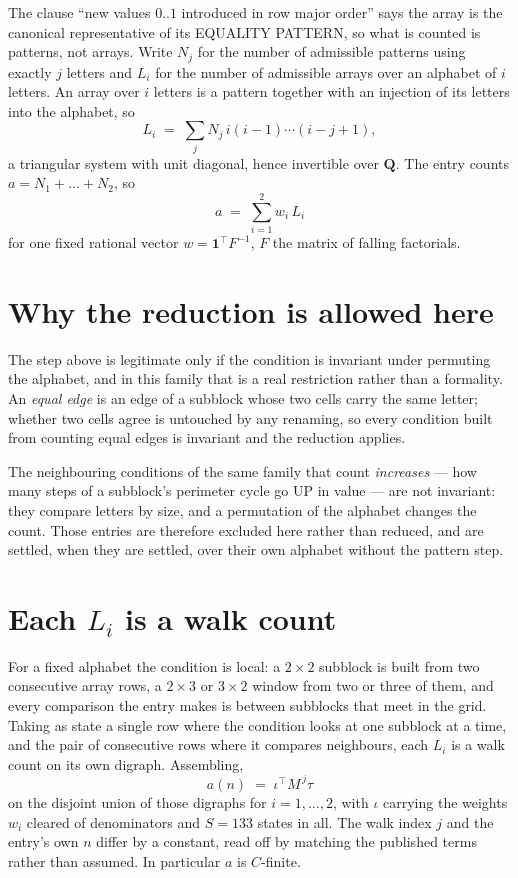 \documentclass[11pt,a4paper]{article}
\theoremstyle{plain}
\theoremstyle{definition}
\begin{document}
The clause ``new values $0..1$ introduced in row major order'' says the array is the
canonical representative of its EQUALITY PATTERN, so what is counted is patterns, not arrays.
Write $N_j$ for the number of admissible patterns using exactly $j$ letters and $L_i$ for the
number of admissible arrays over an alphabet of $i$ letters. An array over $i$ letters is a
pattern together with an injection of its letters into the alphabet, so
\[
L_i\;=\;\sum_j N_j\,i(i-1)\cdots(i-j+1),
\]
a triangular system with unit diagonal, hence invertible over $\mathbf{Q}$. The entry counts
$a=N_1+\dots+N_{2}$, so
\[
a\;=\;\sum_{i=1}^{2}w_i\,L_i
\]
for one fixed rational vector $w=\mathbf{1}^{\!\top}F^{-1}$, $F$ the matrix of falling
factorials.

\section{Why the reduction is allowed here}

The step above is legitimate only if the condition is invariant under permuting the alphabet,
and in this family that is a real restriction rather than a formality. An \emph{equal edge}
is an edge of a subblock whose two cells carry the same letter; whether two cells agree is
untouched by any renaming, so every condition built from counting equal edges is invariant and
the reduction applies.

The neighbouring conditions of the same family that count \emph{increases} --- how many steps
of a subblock's perimeter cycle go UP in value --- are not invariant: they compare letters by
size, and a permutation of the alphabet changes the count. Those entries are therefore excluded
here rather than reduced, and are settled, when they are settled, over their own alphabet
without the pattern step.

\section{Each $L_i$ is a walk count}

For a fixed alphabet the condition is local: a $2\times2$ subblock is built from two
consecutive array rows, a $2\times3$ or $3\times2$ window from two or three of them, and every
comparison the entry makes is between subblocks that meet in the grid. Taking as state a single
row where the condition looks at one subblock at a time, and the pair of consecutive rows where
it compares neighbours, each $L_i$ is a walk count on its own digraph. Assembling,
\[
a(n)\;=\;\iota^{\!\top}M^{\,j}\tau
\]
on the disjoint union of those digraphs for $i=1,\dots,2$, with $\iota$ carrying the weights
$w_i$ cleared of denominators and $S=133$ states in all. The walk index $j$ and the entry's own
$n$ differ by a constant, read off by matching the published terms rather than assumed. In
particular $a$ is $C$-finite.
\end{document}
